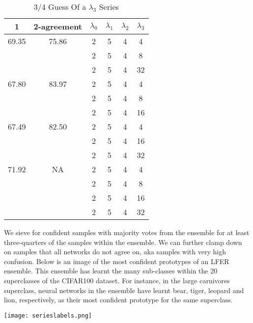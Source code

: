 \documentclass[journal]{journal}
\begin{document}
\begin{table}[h]

\begin{center}
\begin{tabular}{|c|c|c|c|c|c|}
    \hline
       \multirow{ 5}{*}{1} 3/4 guess ACC & 2-agreement &$\lambda_{0}$ & $\lambda_{1}$ & $\lambda_{2}$ & $\lambda_{3}$ \\
     \hline
     69.35 & 75.86 & 2 & 5 & 4 & 4 \\
    && 2 & 5 & 4 & 8\\
      & & 2 & 5 & 4 & 32\\
    \hline
      67.80 & 83.97  & 2 & 5 & 4 & 4 \\
    && 2 & 5 & 4 & 8\\
      & & 2 & 5 & 4 & 16\\
       \hline
        67.49  & 82.50 & 2 & 5 & 4 & 4 \\
    && 2 & 5 & 4 & 16\\
      & & 2 & 5 & 4 & 32\\
      \hline
        71.92  & NA & 2 & 5 & 4 & 4 \\
    && 2 & 5 & 4 & 8\\
    && 2 & 5 & 4 & 16\\
      & & 2 & 5 & 4 & 32\\ \hline

\end{tabular}
\end{center}
\label{tab:multicol}
\caption{3/4 Guess Of a $\lambda_{3}$ Series}
\end{table}

We sieve for confident samples with majority votes from the ensemble for at least three-quarters of the samples within the ensemble. We can further clamp down on samples that all networks do not agree on, aka samples with very high confusion. Below is an image of the most confident prototypes of an LFER ensemble. This ensemble has learnt the many sub-classes within the 20 superclasses of the CIFAR100 dataset. For instance, in the large carnivores superclass, neural networks in the ensemble have learnt bear, tiger, leopard and lion, respectively, as their most confident prototype for the same superclass. 

\begin{minipage}{\linewidth}
\texttt{[image: serieslabels.png]}
\end{minipage}
\end{document}

